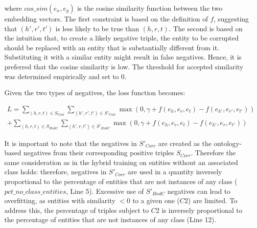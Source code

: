 \documentclass[sigconf]{acmart}
\begin{document}
\noindent where $cos\_sim(e_x,e_y)$ is the cosine similarity function between the two embedding vectors. The first constraint is based on the definition of $f$, suggesting that $(h',r',t')$ is less likely to be  true than $(h,r,t)$. The second is based on the intuition that, to create a likely negative triple, the entity to be corrupted should be replaced with an entity that is substantially different from it. Substituting it with a similar entity might result in false negatives. Hence, it is preferred that the cosine similarity is low. The threshold for accepted similarity was determined empirically and set to 0. 

Given the two types of negatives,  the loss function becomes:
\begin{scriptsize}
\[
\begin{split}
L = \sum_{(h,r,t) \in S_{\text{Corr}}} \sum_{(h',r',t') \in S'_{\text{Corr}}} \max(0, \gamma + f(e_h, e_r, e_t) - f(e_{h'}, e_{r'}, e_{t'})) \\
 + \sum_{(h,r,t) \in S_{RndC}} \sum_{(h',r,t') \in S'_{RndC}} \max(0, \gamma + f(e_h, e_r, e_t) - f(e_{h'}, e_r, e_{t'})) 
\end{split}
\]
\end{scriptsize}

\noindent It is important to note that the negatives in $S'_{Corr}$ are created as the ontology-based negatives from their corresponding positive triples $S_{Corr}$.
Therefore the same consideration as in the hybrid training on entities without an associated class holds: therefore, negatives in $S'_{Corr}$ are used in a quantity inversely proportional to the percentage of entities that are not instances of any class (\(pct\_no\_class\_entities\), Line 5). Excessive use of $S'_{RndC}$ negatives can lead to overfitting, as entities with similarity $<0$ to a given one ($C2$) are limited. To address this, the percentage of triples subject to $C2$ is inversely proportional to the percentage of entities that are not instances of any class (Line 12). 
\end{document}
